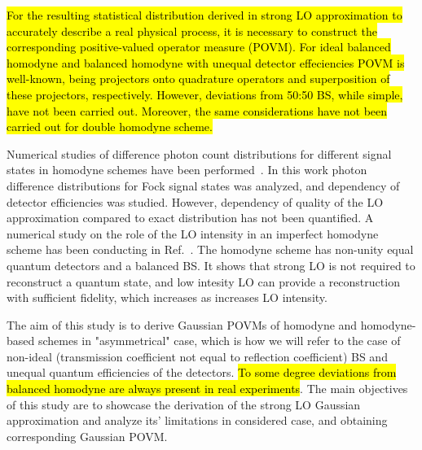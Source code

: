 \documentclass[]{article}
\begin{document}
\hl{%
For the resulting statistical distribution derived in strong LO approximation to accurately describe a real physical process, it is necessary to construct the corresponding positive-valued operator measure (POVM). For ideal balanced homodyne and balanced homodyne with unequal detector effeciencies POVM is well-known, being projectors onto quadrature operators and superposition of these projectors, respectively. 
However, deviations from 50:50 BS, while simple, have not been carried out. Moreover, the same considerations have not been carried out for double homodyne scheme.
}

Numerical studies of difference photon count distributions for different signal states in homodyne schemes have been performed~\cite{freyberger1993photon}. In this work photon difference distributions for Fock signal states was analyzed, and dependency of detector efficiencies was studied. However, dependency of quality of the LO approximation compared to exact distribution has not been quantified. A numerical study on the role of the LO intensity in an imperfect homodyne scheme has been conducting in Ref.~\cite{OLIVARES2020126354}. The homodyne scheme has non-unity equal quantum detectors and a balanced BS. It shows that strong LO is not required to reconstruct a quantum state, and low intesity LO can provide a reconstruction with sufficient fidelity, which increases as increases LO intensity. 


The aim of this study is to derive  Gaussian POVMs of homodyne and homodyne-based schemes in "asymmetrical" case, which is how we will refer to the case of non-ideal (transmission coefficient not equal to reflection coefficient) BS and unequal quantum efficiencies of the detectors. \hl{To some degree deviations from balanced homodyne are always present in real experiments}.
The main objectives of this study are
to showcase the derivation of the strong LO Gaussian approximation and analyze its' limitations in considered case, and obtaining corresponding Gaussian POVM.
\end{document}
